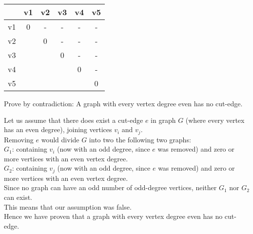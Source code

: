 \documentclass[12pt]{article}
\newenvironment{question}[2][Question]{\begin{trivlist}
\item[\hskip \labelsep {\bfseries #1}\hskip \labelsep {\bfseries #2.}]}{\end{trivlist}}
\begin{document}
	\begin{tabular}{c|c|c|c|c|c|}
		\cline{2-6}
		& v1 & v2 & v3 & v4 & v5 \\
		\hline
		\multicolumn{1}{|c|}{v1} & 0 & - & - & - & - \\
		\hline
		\multicolumn{1}{|c|}{v2} &   & 0 & - & - & - \\
		\hline
		\multicolumn{1}{|c|}{v3} &   &   & 0 & - & - \\
		\hline
		\multicolumn{1}{|c|}{v4} &   &   &   & 0 & - \\
		\hline
		\multicolumn{1}{|c|}{v5} &   &   &   &   & 0 \\
		\hline
	\end{tabular}


\begin{question}{8}
Prove by contradiction: A graph with every vertex degree even has no cut-edge.
\end{question}

Let us assume that there does exist a cut-edge $e$ in graph $G$ (where every vertex has an even degree), joining vertices $v_i$ and $v_j$.\\
Removing $e$ would divide $G$ into two the following two graphs:\\
$G_1$: containing $v_i$ (now with an odd degree, since $e$ was removed) and zero or more vertices with an even vertex degree.\\
$G_2$: containing $v_j$ (now with an odd degree, since $e$ was removed) and zero or more vertices with an even vertex degree.\\
Since no graph can have an odd number of odd-degree vertices, neither $G_1$ nor $G_2$ can exist.\\
This means that our assumption was false.\\
Hence we have proven that a graph with every vertex degree even has no cut-edge.




\end{document}
